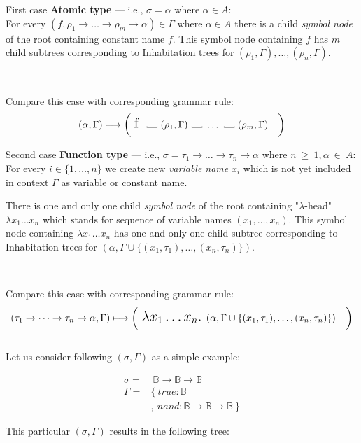 \documentclass[12pt,a4paper]{report}
\newcommand{\Lets}{Let us }
\newcommand\Vtextvisiblespace[1][.3em]{%
  \mbox{\kern.06em\vrule height.3ex}%
  \vbox{\hrule width#1}%
  \hbox{\vrule height.3ex}}
\begin{document}
First case \textbf{Atomic type} --- i.e., $\sigma = \alpha$ where $\alpha \in A$:\\
For every $(f,\rho_1 \rightarrow \dots \rightarrow \rho_m \rightarrow \alpha) \in \Gamma$
where $\alpha \in A$ there is a child \textit{symbol node} of the root containing constant name $f$.
This symbol node containing $f$ has $m$ child subtrees corresponding to Inhabitation trees for 
$(\rho_1,\Gamma),\dots,(\rho_n,\Gamma)$.   

~

Compare this case with corresponding grammar rule:
\[ 
	( \alpha , \Gamma )  \longmapsto
	\bigg( \mbox{ {\Large f }}
	  \mbox{ \Vtextvisiblespace[1em] } 
	  ( \rho_1 , \Gamma )
	  \mbox{ \Vtextvisiblespace[1em] } 
	  \dots
	  \mbox{ \Vtextvisiblespace[1em] } 
	  ( \rho_m , \Gamma )
	  \quad \bigg)
\]

Second case \textbf{Function type} --- i.e., 
$\sigma = \tau_1 \rightarrow \dots \rightarrow \tau_n \rightarrow \alpha$
where $n~\geq~1, \alpha~\in~A$:\\
For every  $i \in \{1,\dots,n\}$ we create new \textit{variable name} $x_i$ which is not yet included in context $\Gamma$ as variable or constant name.
 
There is one and only one child \textit{symbol node} of the root containing "$\lambda$-head" 
$\lambda x_1 \dots x_n$ which stands for sequence of variable names $(x_1,\dots,x_n)$.
This symbol node containing $\lambda x_1 \dots x_n$
has one and only one child subtree corresponding to Inhabitation trees for 
$(\alpha,\Gamma \cup \{ (x_1,\tau_1) , \dots , (x_n,\tau_n) \})$.   

~

Compare this case with corresponding grammar rule:
\[ 
	( \tau_1 \rightarrow \dots \rightarrow \tau_n \rightarrow \alpha , \Gamma )  \longmapsto
	\bigg( \mbox{ {\Large 
	$\lambda x_1 \dots x_n .$ 
	}}( \alpha , \Gamma \cup \{ (x_1,\tau_1),\dots,(x_n,\tau_n) \} ) \quad \bigg)
\]
~\\
\Lets consider following $(\sigma,\Gamma)$ as a simple example:

\begin{align*}
\sigma =& ~ \mathbb{B} \rightarrow  \mathbb{B} \rightarrow  \mathbb{B} \\ 
\Gamma =& \{ ~ true : \mathbb{B}  \\
        &  , ~ nand :  \mathbb{B} \rightarrow \mathbb{B} \rightarrow \mathbb{B} ~ \}
\end{align*}

This particular $(\sigma,\Gamma)$ results in the following tree:\\
\end{document}
